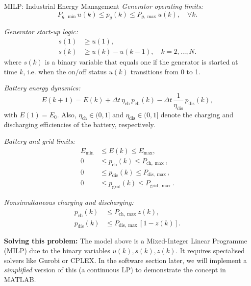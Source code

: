 \begin{examplebox}{MILP: Industrial Energy Management}
	\emph{Generator operating limits:}
	\begin{equation}
		P_{g,\min} u(k) \le p_g(k) \le P_{g,\max} u(k),
		\quad \forall k.
	\end{equation}
	
	\emph{Generator start-up logic:}
	\begin{align}
		s(1) &\ge u(1),\\
		s(k) &\ge u(k) - u(k-1), \quad k=2,\dots,N.
	\end{align}
	where $s(k)$ is a binary variable that equals one if the generator is started at time $k$, i.e. when the on/off status $u(k)$ transitions from 0 to 1.
	
	\emph{Battery energy dynamics:}
	\begin{equation}
		E(k+1) = E(k) + \Delta t\,\eta_{\mathrm{ch}}\,p_{\mathrm{ch}}(k)
		- \Delta t\,\frac{1}{\eta_{\mathrm{dis}}}\,p_{\mathrm{dis}}(k),
	\end{equation}
	with $E(1)=E_0$. Also, $\eta_{\mathrm{ch}}\in(0,1]$ and $\eta_{\mathrm{dis}}\in(0,1]$ denote the charging and discharging efficiencies of the battery, respectively.
	
	\emph{Battery and grid limits:}
	\begin{align}
		E_{\min} &\le E(k) \le E_{\max},\\
		0 &\le p_{\mathrm{ch}}(k) \le P_{\mathrm{ch},\max},\\
		0 &\le p_{\mathrm{dis}}(k) \le P_{\mathrm{dis},\max},\\
		0 &\le p_{\mathrm{grid}}(k) \le P_{\mathrm{grid},\max}.
	\end{align}
	
	\emph{Nonsimultaneous charging and discharging:}
	\begin{align}
		p_{\mathrm{ch}}(k) &\le P_{\mathrm{ch},\max} z(k),\\
		p_{\mathrm{dis}}(k) &\le P_{\mathrm{dis},\max} [1-z(k)].
	\end{align}
	
	\tcbline
	\textbf{Solving this problem:}
	The model above is a Mixed-Integer Linear Programme (MILP) due to the binary variables $u(k), s(k), z(k)$. It requires specialised solvers like Gurobi or CPLEX. In the software section later, we will implement a \emph{simplified} version of this (a continuous LP) to demonstrate the concept in MATLAB.
	
\end{examplebox}


